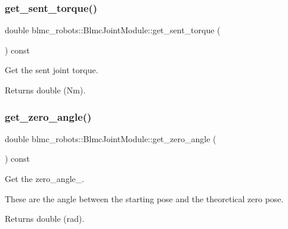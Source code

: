 \subsubsection{\texorpdfstring{get\+\_\+sent\+\_\+torque()}{get\_sent\_torque()}}
{\footnotesize\ttfamily double blmc\+\_\+robots\+::\+Blmc\+Joint\+Module\+::get\+\_\+sent\+\_\+torque (\begin{DoxyParamCaption}{ }\end{DoxyParamCaption}) const}



Get the sent joint torque. 

\begin{DoxyReturn}{Returns}
double (Nm). 
\end{DoxyReturn}
\mbox{\label{classblmc__robots_1_1BlmcJointModule_ad6fab5bc289e01a34374ea8031f5383e}} 
\subsubsection{\texorpdfstring{get\+\_\+zero\+\_\+angle()}{get\_zero\_angle()}}
{\footnotesize\ttfamily double blmc\+\_\+robots\+::\+Blmc\+Joint\+Module\+::get\+\_\+zero\+\_\+angle (\begin{DoxyParamCaption}{ }\end{DoxyParamCaption}) const}



Get the zero\+\_\+angle\+\_\+. 

These are the angle between the starting pose and the theoretical zero pose.

\begin{DoxyReturn}{Returns}
double (rad). 
\end{DoxyReturn}
\mbox{\label{classblmc__robots_1_1BlmcJointModule_aa534604b5ead6a3eee5c47a9454f6834}} 
